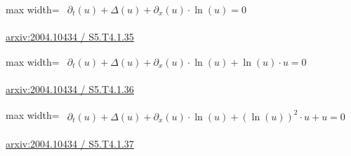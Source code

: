 \documentclass[UTF8,10pt,a4paper,fontset=mac]{ctexart}
\begin{document}
\begin{minipage}{\linewidth}\begin{center}\begin{adjustbox}{max width=\linewidth}$\displaystyle\begin{gathered}\begin{gathered}\partial_{t}(u)+\Delta(u)+\partial_{x}(u)\cdot \ln(u)=0\end{gathered}\end{gathered}$\end{adjustbox}\end{center}{\small\href{https://arxiv.org/html/2004.10434#S5.T4.1.35}{arxiv:2004.10434 / S5.T4.1.35}}\par\end{minipage}\par\vspace{6mm}

\begin{minipage}{\linewidth}\begin{center}\begin{adjustbox}{max width=\linewidth}$\displaystyle\begin{gathered}\begin{gathered}\partial_{t}(u)+\Delta(u)+\partial_{x}(u)\cdot \ln(u)+\ln(u)\cdot u=0\end{gathered}\end{gathered}$\end{adjustbox}\end{center}{\small\href{https://arxiv.org/html/2004.10434#S5.T4.1.36}{arxiv:2004.10434 / S5.T4.1.36}}\par\end{minipage}\par\vspace{6mm}

\begin{minipage}{\linewidth}\begin{center}\begin{adjustbox}{max width=\linewidth}$\displaystyle\begin{gathered}\begin{gathered}\partial_{t}(u)+\Delta(u)+\partial_{x}(u)\cdot \ln(u)+(\ln(u))^{2}\cdot u+u=0\end{gathered}\end{gathered}$\end{adjustbox}\end{center}{\small\href{https://arxiv.org/html/2004.10434#S5.T4.1.37}{arxiv:2004.10434 / S5.T4.1.37}}\par\end{minipage}\par\vspace{6mm}
\end{document}
